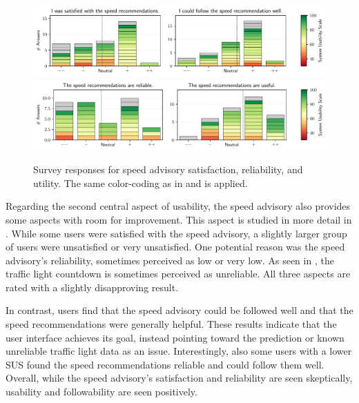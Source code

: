 \begin{figure}[t]
\caption{Survey responses for speed advisory satisfaction, reliability, and utility. The same color-coding as in  and  is applied.}\label{fig:speed-recommendations-satisfaction}
\includegraphics[width=\linewidth]{images/app-usability-questions-speed-recommendations-satisfaction.pdf}
\\
\includegraphics[width=\linewidth]{images/app-usability-questions-speed-recommendations-reliability.pdf}
\end{figure}

Regarding the second central aspect of usability, the speed advisory also provides some aspects with room for improvement. This aspect is studied in more detail in . While some users were satisfied with the speed advisory, a slightly larger group of users were unsatisfied or very unsatisfied. One potential reason was the speed advisory's reliability, sometimes perceived as low or very low. As seen in  , the traffic light countdown is sometimes perceived as unreliable. All three aspects are rated with a slightly disapproving result.

In contrast, users find that the speed advisory could be followed well and that the speed recommendations were generally helpful. These results indicate that the user interface achieves its goal, instead pointing toward the prediction or known unreliable traffic light data as an issue. Interestingly, also some users with a lower SUS found the speed recommendations reliable and could follow them well. Overall, while the speed advisory's satisfaction and reliability are seen skeptically, usability and followability are seen positively.

